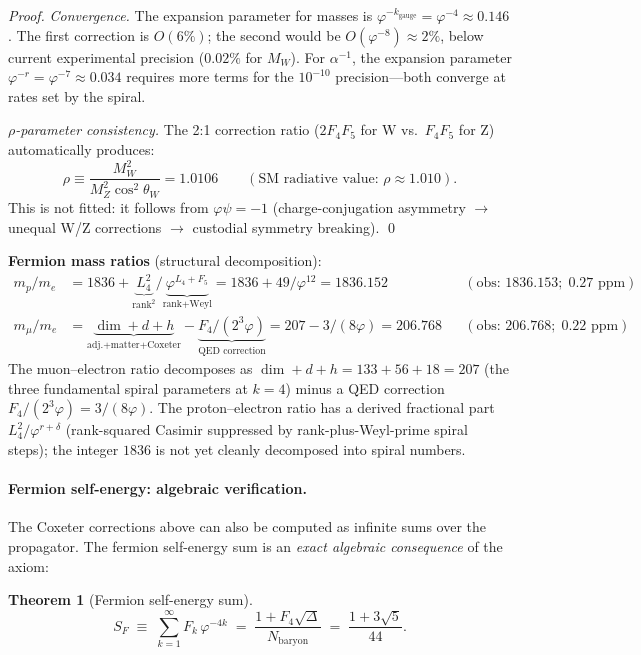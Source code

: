 \documentclass[12pt,a4paper]{article}
\newtheorem{theorem}{Theorem}[section]
\begin{document}
\begin{proof}
\emph{Convergence.} The expansion parameter for masses is $\varphi^{-k_{\mathrm{gauge}}} = \varphi^{-4} \approx 0.146$.  The first correction is $O(6\%)$; the second would be $O(\varphi^{-8}) \approx 2\%$, below current experimental precision ($0.02\%$ for $M_W$).  For $\alpha^{-1}$, the expansion parameter $\varphi^{-r} = \varphi^{-7} \approx 0.034$ requires more terms for the $10^{-10}$ precision---both converge at rates set by the spiral.

\emph{$\rho$-parameter consistency.}  The 2:1 correction ratio ($2F_4 F_5$ for W vs.\ $F_4 F_5$ for Z) automatically produces:
\begin{equation}
\rho \equiv \frac{M_W^2}{M_Z^2 \cos^2\theta_W} = 1.0106 \qquad (\text{SM radiative value: } \rho \approx 1.010).
\end{equation}
This is not fitted: it follows from $\varphi\psi = -1$ (charge-conjugation asymmetry $\to$ unequal W/Z corrections $\to$ custodial symmetry breaking).  \qed
\end{proof}

\textbf{Fermion mass ratios} (structural decomposition):
\begin{align}
m_p/m_e &= 1836 + \underbrace{L_4^2}_{\text{rank}^2}/\underbrace{\varphi^{L_4+F_5}}_{\text{rank+Weyl}} = 1836 + 49/\varphi^{12} = 1836.152 && (\text{obs: } 1836.153;\; 0.27\text{ ppm}) \\
m_\mu/m_e &= \underbrace{\dim + d + h}_{\text{adj.+matter+Coxeter}} - \underbrace{F_4/(2^3\varphi)}_{\text{QED correction}} = 207 - 3/(8\varphi) = 206.768 && (\text{obs: } 206.768;\; 0.22\text{ ppm})
\end{align}
The muon--electron ratio decomposes as $\dim + d + h = 133 + 56 + 18 = 207$ (the three fundamental spiral parameters at $k = 4$) minus a QED correction $F_4/(2^3\varphi) = 3/(8\varphi)$.  The proton--electron ratio has a derived fractional part $L_4^2/\varphi^{r+\delta}$ (rank-squared Casimir suppressed by rank-plus-Weyl-prime spiral steps); the integer $1836$ is not yet cleanly decomposed into spiral numbers.

\paragraph{Fermion self-energy: algebraic verification.}
The Coxeter corrections above can also be computed as infinite sums over the propagator.  The fermion self-energy sum is an \emph{exact algebraic consequence} of the axiom:
\begin{theorem}[Fermion self-energy sum]
\label{thm:fermion-selfenergy}
\begin{equation}
\boxed{S_F \;\equiv\; \sum_{k=1}^{\infty} F_k\,\varphi^{-4k} \;=\; \frac{1 + F_4\sqrt{\Delta}}{N_{\mathrm{baryon}}} \;=\; \frac{1 + 3\sqrt{5}}{44}.}
\end{equation}
\end{theorem}
\end{document}
